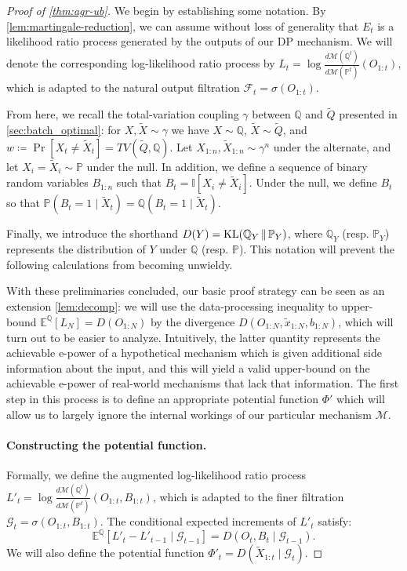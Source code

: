 \documentclass{article}
\DeclareMathOperator{\KLop}{KL}
\newcommand{\KL}[2]{%
  \mathchoice
    {\KLop\!\left(#1\,\middle\|\,#2\right)}%
    {\KLop(#1\,\Vert\,#2)}%
    {\KLop(#1\,\Vert\,#2)}%
    {\KLop(#1\,\Vert\,#2)}%
}
\newcommand{\Null}{\mathbb{P}}
\newcommand{\E}{\mathbb{E}}
\newcommand{\Alt}{\mathbb{Q}}
\newcommand{\M}{\mathcal{M}}
\begin{document}
\begin{proof}[Proof of \cref{thm:agr-ub}]

    We begin by establishing some notation. By \cref{lem:martingale-reduction}, we can assume without loss of generality that $E_t$ is a likelihood ratio process generated by the outputs of our DP mechanism. We will denote the corresponding log-likelihood ratio process by $L_t = \log \frac{d\M(\Alt^t)}{d\M(\Null^t)}(O_{1:t})$, which is adapted to the natural output filtration $\mathcal{F}_t = \sigma(O_{1:t})$.
    
    From here, we recall the total-variation coupling $\gamma$ between $\Alt$ and $\widetilde Q$ presented in \cref{sec:batch_optimal}: for $X, \tilde X \sim \gamma$ we have $X \sim \Alt$, $\tilde X \sim \widetilde Q$, and $w \coloneq \Pr[X_t \neq \tilde X_t] = TV(\widetilde Q, \Alt)$. Let $X_{1:n}, \tilde X_{1:n} \sim \gamma^n$ under the alternate, and let  $X_i = \tilde X_i \sim \Null$ under the null. In addition, we define a sequence of binary random variables $B_{1:n}$ such that $B_t = \mathbb{I}[X_i \neq \tilde X_i]$. Under the null, we define $B_t$ so that $\Null(B_t=1 \mid \tilde X_t) = \Alt(B_t = 1 \mid \tilde X_t)$.

    Finally, we introduce the shorthand $D(Y) = \KL{\Alt_Y}{\Null_Y}$, where $\Alt_Y$ (resp. $\Null_Y$) represents the distribution of $Y$ under $\Alt$ (resp. $\Null$). This  notation will prevent the following calculations from becoming unwieldy.
    
    With these preliminaries concluded, our basic proof strategy can be seen as an extension \cref{lem:decomp}: we will use the data-processing inequality to upper-bound $\E^\Alt[L_N] = D(O_{1:N})$ by the divergence $D(O_{1:N}, \tilde x_{1:N}, b_{1:N})$, which will turn out to be easier to analyze. Intuitively, the latter quantity represents the achievable e-power of a hypothetical mechanism which is given additional side information about the input, and this will yield a valid upper-bound on the achievable e-power of real-world mechanisms that lack that information. The first step in this process is to define an appropriate potential function $\Phi'$ which will allow us to largely ignore the internal workings of our particular mechanism $\M$.

    \paragraph{Constructing the potential function.}
    Formally, we define the augmented log-likelihood ratio process $L'_t = \log \frac{d\M(\Alt^t)}{d\M(\Null^t)}(O_{1:t}, B_{1:t})$, which is adapted to the finer filtration $\mathcal{G}_t = \sigma(O_{1:t}, B_{1:t})$. The conditional expected increments of $L'_t$ satisfy:
    \begin{equation*}
        \E^\Alt[L'_t - L'_{t-1} \mid \mathcal{G}_{t-1}] = D(O_t, B_t \mid \mathcal{G}_{t-1}).
    \end{equation*}
    We will also define the potential function $\Phi'_t = D(\tilde X_{1:t} \mid \mathcal{G}_{t})$. 
    

\end{proof}
\end{document}
